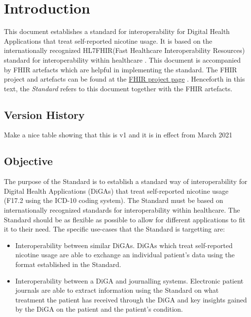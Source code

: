 \documentclass[12px]{report}
\newcommand{\fhir}{FHIR\textsuperscript{\textregistered}}
\newcommand{\hl}{HL7\textsuperscript{\textregistered}}
\begin{document}
\tableofcontents

\chapter{Introduction}
\label{ch:intro}

This document establishes a standard for interoperability for Digital Health Applications that treat self-reported nicotine usage. It is based on the internationally recognized \hl \fhir (Fast Healthcare Interoperability Resources) standard for interoperability 
within healthcare \cite{FHIR}. This document is accompanied by FHIR artefacts which are helpful in implementing the standard. The FHIR project and artefacts can be found at the \href{https://simplifier.net/treat-nicotine-usage-diga}{FHIR project page} \cite{project}.
Henceforth in this text, the \textit{Standard} refers to this document together with the FHIR artefacts.

\section{Version History}
Make a nice table showing that this is v1 and it is in effect from March 2021

\section{Objective}
The purpose of the Standard is to establish a standard way of interoperability for Digital Health Applications (DiGAs) that treat self-reported nicotine usage (F17.2 using the ICD-10 coding system). The Standard must be based on internationally recognized
standards for interoperability within healthcare. The Standard should be as flexible as possible to allow for different applications to fit it to their need. The specific use-cases that the Standard is targetting are:

\begin{itemize}
    \item Interoperability between similar DiGAs. DiGAs which treat self-reported nicotine usage are able to exchange an individual patient's data using the format established in the Standard.
    \item Interoperability between a DiGA and journalling systems. Electronic patient journals are able to extract information using the Standard on what treatment the patient has received through the DiGA and key insights gained by the DiGA on the patient and the patient's condition.
\end{itemize}
\end{document}
